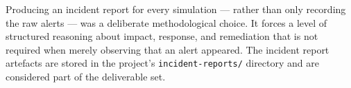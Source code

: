 Producing an incident report for every simulation --- rather than only
recording the raw alerts --- was a deliberate methodological choice. It forces
a level of structured reasoning about impact, response, and remediation that
is not required when merely observing that an alert appeared. The incident
report artefacts are stored in the project's \texttt{incident-reports/}
directory and are considered part of the deliverable set.
